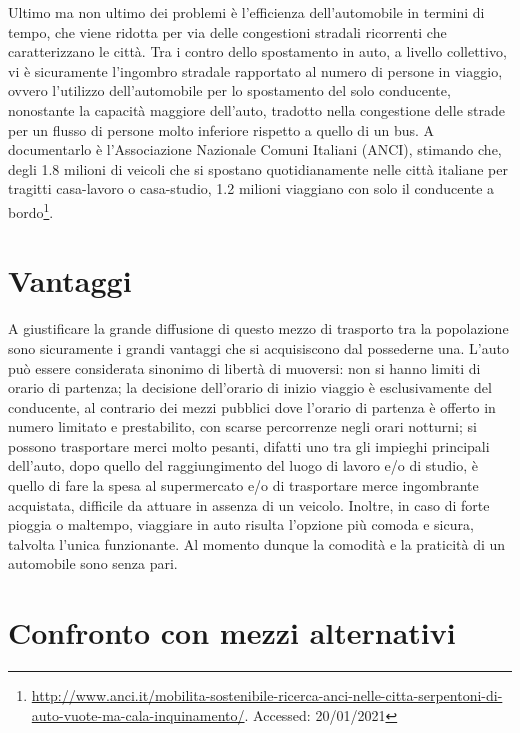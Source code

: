 Ultimo ma non ultimo dei problemi è l'efficienza dell'automobile in termini di tempo, che viene ridotta per via delle congestioni stradali ricorrenti che caratterizzano le città. Tra i contro dello spostamento in auto, a livello collettivo, vi è sicuramente l'ingombro stradale rapportato al numero di persone in viaggio, ovvero l'utilizzo dell'automobile per lo spostamento del solo conducente, nonostante la capacità maggiore dell'auto, tradotto nella congestione delle strade per un flusso di persone molto inferiore rispetto a quello di un bus. A documentarlo è l'Associazione Nazionale Comuni Italiani (ANCI), stimando che, degli 1.8 milioni di veicoli che si spostano quotidianamente nelle città italiane per tragitti casa-lavoro o casa-studio, 1.2 milioni viaggiano con solo il conducente a bordo\footnote{\url{http://www.anci.it/mobilita-sostenibile-ricerca-anci-nelle-citta-serpentoni-di-auto-vuote-ma-cala-inquinamento/}. Accessed: 20/01/2021}.

\section{Vantaggi}

A giustificare la grande diffusione di questo mezzo di trasporto tra la popolazione sono sicuramente i grandi vantaggi che si acquisiscono dal possederne una. L'auto può essere considerata sinonimo di libertà di muoversi: non si hanno limiti di orario di partenza; la decisione dell'orario di inizio viaggio è esclusivamente del conducente, al contrario dei mezzi pubblici dove l'orario di partenza è offerto in numero limitato e prestabilito, con scarse percorrenze negli orari notturni; si possono trasportare merci molto pesanti, difatti uno tra gli impieghi principali dell'auto, dopo quello del raggiungimento del luogo di lavoro e/o di studio, è quello di fare la spesa al supermercato e/o di trasportare merce ingombrante acquistata, difficile da attuare in assenza di un veicolo. Inoltre, in caso di forte pioggia o maltempo, viaggiare in auto risulta l'opzione più comoda e sicura, talvolta l'unica funzionante. Al momento dunque la comodità e la praticità di un automobile sono senza pari.

\section{Confronto con mezzi alternativi}

